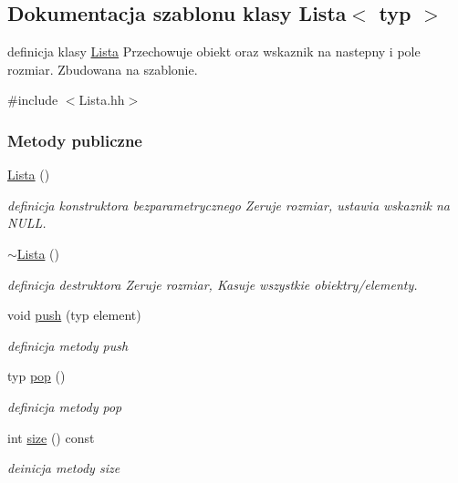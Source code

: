\hypertarget{class_lista}{}\subsection{Dokumentacja szablonu klasy Lista$<$ typ $>$}
\label{class_lista}


definicja klasy \hyperlink{class_lista}{Lista} Przechowuje obiekt oraz wskaznik na nastepny i pole rozmiar. Zbudowana na szablonie.  




{\ttfamily \#include $<$Lista.\+hh$>$}

\subsubsection*{Metody publiczne}
\begin{DoxyCompactItemize}
\item 
\hyperlink{class_lista_a23a5b3313a893057276942e74f330b89}{Lista} ()
\begin{DoxyCompactList}\small\item\em definicja konstruktora bezparametrycznego Zeruje rozmiar, ustawia wskaznik na N\+U\+L\+L. \end{DoxyCompactList}\item 
\hyperlink{class_lista_accc5a3585c7f97372f35f81ef574646e}{$\sim$\+Lista} ()
\begin{DoxyCompactList}\small\item\em definicja destruktora Zeruje rozmiar, Kasuje wszystkie obiektry/elementy. \end{DoxyCompactList}\item 
void \hyperlink{class_lista_afe3d2ff8a9161d30301bfc210287ab51}{push} (typ element)
\begin{DoxyCompactList}\small\item\em definicja metody push \end{DoxyCompactList}\item 
typ \hyperlink{class_lista_a536acf0c981ac359d145da0cc452aadf}{pop} ()
\begin{DoxyCompactList}\small\item\em definicja metody pop \end{DoxyCompactList}\item 
int \hyperlink{class_lista_a8025f28bcc402832d854af6b874451f1}{size} () const 
\begin{DoxyCompactList}\small\item\em deinicja metody size \end{DoxyCompactList}\end{DoxyCompactItemize}
